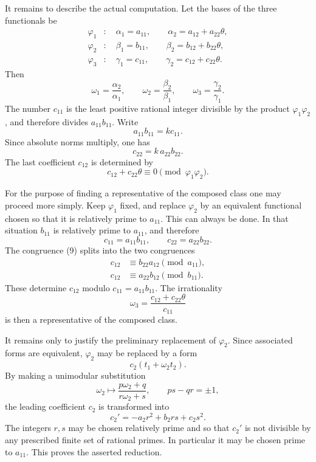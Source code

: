 \documentclass[12pt,a4paper]{article}
\begin{document}
It remains to describe the actual computation.  Let the bases of the three functionals be
\[
\begin{aligned}
  \varphi_1&:\quad
  \alpha_1=a_{11},\qquad
  \alpha_2=a_{12}+a_{22}\theta,\\
  \varphi_2&:\quad
  \beta_1=b_{11},\qquad
  \beta_2=b_{12}+b_{22}\theta,\\
  \varphi_3&:\quad
  \gamma_1=c_{11},\qquad
  \gamma_2=c_{12}+c_{22}\theta.
\end{aligned}
\tag{6}
\]
Then
\[
  \omega_1=\frac{\alpha_2}{\alpha_1},\qquad
  \omega_2=\frac{\beta_2}{\beta_1},\qquad
  \omega_3=\frac{\gamma_2}{\gamma_1}.
\]
The number \(c_{11}\) is the least positive rational integer divisible by the product \(\varphi_1\varphi_2\), and therefore divides \(a_{11}b_{11}\).  Write
\[
  a_{11}b_{11}=k c_{11}.
\tag{7}
\]
Since absolute norms multiply, one has
\[
  c_{22}=k\,a_{22}b_{22}.
\tag{8}
\]
The last coefficient \(c_{12}\) is determined by
\[
  c_{12}+c_{22}\theta\equiv0\pmod{\varphi_1\varphi_2}.
\tag{9}
\]

For the purpose of finding a representative of the composed class one may proceed more simply.  Keep \(\varphi_1\) fixed, and replace \(\varphi_2\) by an equivalent functional chosen so that it is relatively prime to \(a_{11}\).  This can always be done.  In that situation \(b_{11}\) is relatively prime to \(a_{11}\), and therefore
\[
  c_{11}=a_{11}b_{11},\qquad
  c_{22}=a_{22}b_{22}.
\tag{10}
\]
The congruence (9) splits into the two congruences
\[
\begin{aligned}
  c_{12}&\equiv b_{22}a_{12}\pmod{a_{11}},\\
  c_{12}&\equiv a_{22}b_{12}\pmod{b_{11}}.
\end{aligned}
\tag{11}
\]
These determine \(c_{12}\) modulo \(c_{11}=a_{11}b_{11}\).  The irrationality
\[
  \omega_3=\frac{c_{12}+c_{22}\theta}{c_{11}}
\tag{12}
\]
is then a representative of the composed class.

It remains only to justify the preliminary replacement of \(\varphi_2\).  Since associated forms are equivalent, \(\varphi_2\) may be replaced by a form
\[
  c_2(t_1+\omega_2 t_2).
\]
By making a unimodular substitution
\[
  \omega_2\mapsto\frac{p\omega_2+q}{r\omega_2+s},
  \qquad ps-qr=\pm1,
\]
the leading coefficient \(c_2\) is transformed into
\[
  c_2'=-a_2r^2+b_2rs+c_2s^2.
\]
The integers \(r,s\) may be chosen relatively prime and so that \(c_2'\) is not divisible by any prescribed finite set of rational primes.  In particular it may be chosen prime to \(a_{11}\).  This proves the asserted reduction.
\end{document}
